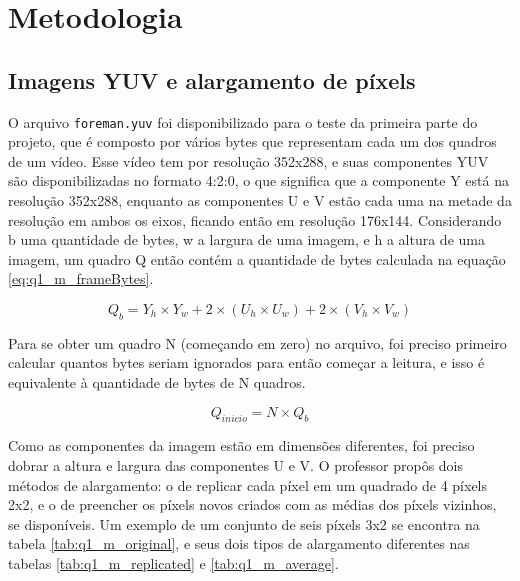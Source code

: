 \documentclass[conference]{IEEEtran}
\begin{document}

\section{Metodologia}


\subsection{Imagens YUV e alargamento de píxels}

O arquivo \texttt{foreman.yuv} foi disponibilizado para o teste da primeira parte do projeto, que é composto por vários bytes que representam cada um dos quadros de um vídeo. Esse vídeo tem por resolução 352x288, e suas componentes YUV são disponibilizadas no formato 4:2:0, o que significa que a componente Y está na resolução 352x288, enquanto as componentes U e V estão cada uma na metade da resolução em ambos os eixos, ficando então em resolução 176x144. Considerando b uma quantidade de bytes, w a largura de uma imagem, e h a altura de uma imagem, um quadro Q então contém a quantidade de bytes calculada na equação \ref{eq:q1_m_frameBytes}.

\begin{equation}
    Q_{b} = Y_{h} \times Y_{w} + 2 \times (U_{h} \times U_{w}) + 2 \times (V_{h} \times V_{w}) \label{eq:q1_m_frameBytes}
\end{equation}

Para se obter um quadro N (começando em zero) no arquivo, foi preciso primeiro calcular quantos bytes seriam ignorados para então começar a leitura, e isso é equivalente à quantidade de bytes de N quadros.

\begin{equation}
    Q_{inicio} = N \times Q_{b} \label{eq:q1_m_frameStart}
\end{equation}

Como as componentes da imagem estão em dimensões diferentes, foi preciso dobrar a altura e largura das componentes U e V. O professor propôs dois métodos de alargamento: o de replicar cada píxel em um quadrado de 4 píxels 2x2, e o de preencher os píxels novos criados com as médias dos píxels vizinhos, se disponíveis. Um exemplo de um conjunto de seis píxels 3x2 se encontra na tabela \ref{tab:q1_m_original}, e seus dois tipos de alargamento diferentes nas tabelas \ref{tab:q1_m_replicated} e \ref{tab:q1_m_average}.
\end{document}
